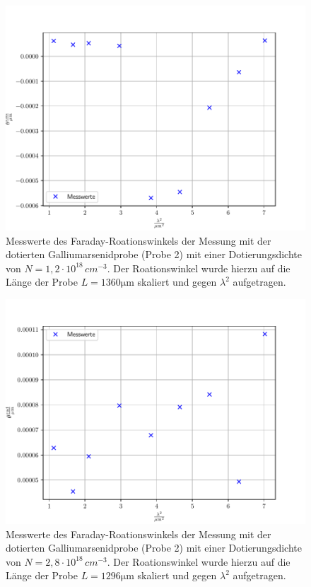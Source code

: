 \noindent
\FloatBarrier
\begin{figure}[h]
    \centering
    \includegraphics[width=1\textwidth]{Winkel_n-dotiert_1.pdf}
    \caption{Messwerte des Faraday-Roationswinkels der Messung mit der dotierten Galliumarsenidprobe (Probe 2) mit einer Dotierungsdichte von $N=1,2\cdot 10^{18}\, \si{cm}^{-3}$. Der Roationswinkel wurde hierzu auf die Länge der Probe $L = 1360 \si{\micro\meter}$ skaliert und gegen $\lambda ^2$ aufgetragen.}
    \label{fig:afig3}
\end{figure}
\FloatBarrier
\noindent

\noindent
\FloatBarrier
\begin{figure}[h]
    \centering
    \includegraphics[width=1\textwidth]{Winkel_n-dotiert_2.pdf}
    \caption{Messwerte des Faraday-Roationswinkels der Messung mit der dotierten Galliumarsenidprobe (Probe 2) mit einer Dotierungsdichte von $N=2,8\cdot 10^{18}\, \si{cm}^{-3}$. Der Roationswinkel wurde hierzu auf die Länge der Probe $L = 1296 \si{\micro\meter}$ skaliert und gegen $\lambda ^2$ aufgetragen.}
    \label{fig:afig4}
\end{figure}
\FloatBarrier
\noindent

